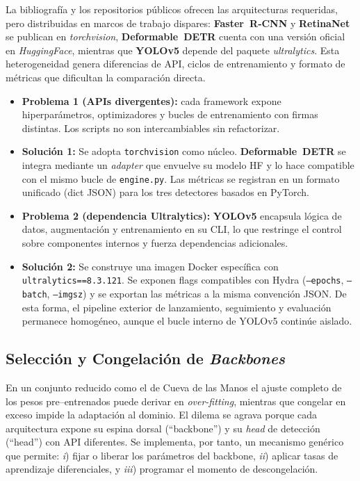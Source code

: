 La bibliografía y los repositorios públicos ofrecen las arquitecturas requeridas, pero distribuidas en marcos de trabajo dispares:
\textbf{Faster~R‐CNN} y \textbf{RetinaNet} se publican en \textit{torchvision}, \textbf{Deformable~DETR} cuenta con una versión oficial en \textit{HuggingFace}, mientras que \textbf{YOLOv5} depende del paquete \textit{ultralytics}.
Esta heterogeneidad genera diferencias de API, ciclos de entrenamiento y formato de métricas que dificultan la comparación directa.

\begin{itemize}
   \item \textbf{Problema 1 (APIs divergentes):} cada framework expone hiperparámetros, optimizadores y bucles de entrenamiento con firmas distintas.
   Los scripts no son intercambiables sin refactorizar.
   \item \textbf{Solución 1:}
   Se adopta \texttt{torchvision} como núcleo.
   \textbf{Deformable~DETR} se integra mediante un \emph{adapter} que envuelve su modelo HF y lo hace compatible con el mismo bucle de \texttt{engine.py}.
   Las métricas se registran en un formato unificado (dict JSON) para los tres detectores basados en PyTorch.
   \item \textbf{Problema 2 (dependencia Ultralytics):}
   \textbf{YOLOv5} encapsula lógica de datos, augmentación y entrenamiento en su CLI, lo que restringe el control sobre componentes internos y fuerza dependencias adicionales.
   \item \textbf{Solución 2:}
   Se construye una imagen Docker específica con \texttt{ultralytics==8.3.121}.
   Se exponen flags compatibles con Hydra (\texttt{--epochs}, \texttt{--batch}, \texttt{--imgsz}) y se exportan las métricas a la misma convención JSON.
   De esta forma, el pipeline exterior de lanzamiento, seguimiento y evaluación permanece homogéneo, aunque el bucle interno de YOLOv5 continúe aislado.
\end{itemize}

\subsection{Selección y Congelación de \emph{Backbones}}\label{ssec:freeze}

En un conjunto reducido como el de Cueva de las Manos el ajuste completo de los pesos pre–entrenados puede derivar en \emph{over-fitting}, mientras que congelar en exceso impide la adaptación al dominio.
El dilema se agrava porque cada arquitectura expone su espina dorsal (“backbone”) y su \emph{head} de detección (“head”) con API diferentes.
Se implementa, por tanto, un mecanismo genérico que permite:
\emph{i}) fijar o liberar los parámetros del backbone,
\emph{ii}) aplicar tasas de aprendizaje diferenciales, y
\emph{iii}) programar el momento de descongelación.

